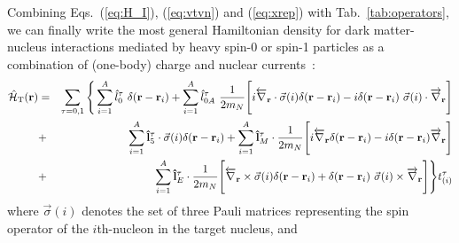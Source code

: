 \documentclass[11pt,a4paper]{article}
\begin{document}
Combining Eqs.~(\ref{eq:H_I}), (\ref{eq:vtvn}) and (\ref{eq:xrep}) with Tab.~\ref{tab:operators}, we can finally write the most general Hamiltonian density for dark matter-nucleus interactions mediated by heavy spin-0 or spin-1 particles as a combination of (one-body) charge and nuclear currents~\cite{Fitzpatrick:2012ix}:
\begin{eqnarray}
\hat{\mathcal{H}}_{\rm T}({\bf{r}}) &=& \sum_{\tau=0,1} \Bigg\{
\sum_{i=1}^A  \hat{l}_0^{\tau}~ \delta({\bf{r}}-{\bf{r}}_i)
+ \sum_{i=1}^A \hat{l}_{0A}^{\tau}~ \frac{1}{2m_N} \Bigg[i \overleftarrow{\nabla}_{\bf{r}} \cdot  \vec{\sigma}(i)\delta({\bf{r}}-{\bf{r}}_i) -i \delta({\bf{r}}-{\bf{r}}_i) \
\vec{\sigma}(i)  \cdot  \overrightarrow{\nabla}_{\bf{r}} \Bigg]  \nonumber \\
 &+& \sum_{i=1}^A  {\bf{\hat{l}}}_5^{\tau} \cdot \vec{\sigma}(i) \delta({\bf{r}}-{\bf{r}}_i) +   \sum_{i=1}^A {\bf{\hat{l}}}_M^{\tau} \cdot \frac{1}{2 m_N} \Bigg[i \overleftarrow{\nabla}_{\bf{r}}\delta({\bf{r}}-{\bf{r}}_i) -i \delta({\bf{r}}-{\bf{r}}_i)\overrightarrow{\nabla}_{\bf{r}} \Bigg]  \nonumber \\
&+& \sum_{i=1}^A {\bf{\hat{l}}}_E^{\tau} \cdot \frac{1}{2m_N} \Bigg[ \overleftarrow{\nabla}_{\bf{r}} \times \vec{\sigma}(i) \delta({\bf{r}}-{\bf{r}}_i) +\delta({\bf{r}}-{\bf{r}}_i)\
  \vec{\sigma}(i) \times \overrightarrow{\nabla}_{\bf{r}} \Bigg] \Bigg\} t^{\tau}_{(i)}
\label{eq:Hx}
\end{eqnarray}
where $\vec{\sigma}(i)$ denotes the set of three Pauli matrices representing the spin operator of the $i$th-nucleon in the target nucleus, and 
\end{document}
